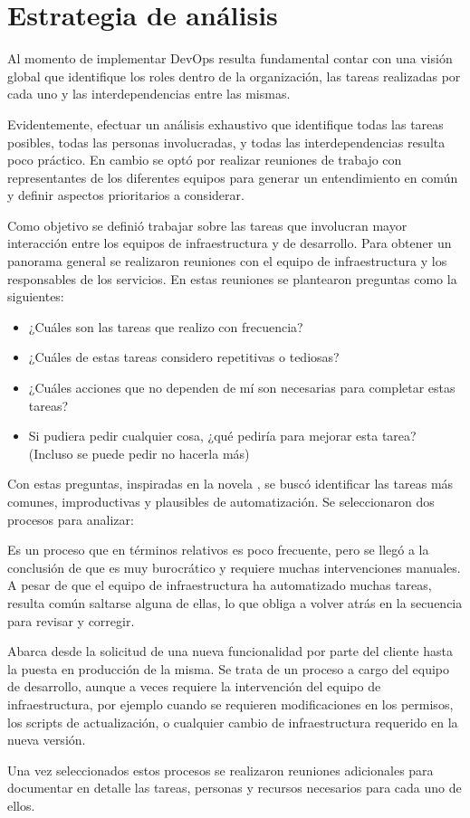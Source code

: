 \section{Estrategia de análisis}
%
Al momento de implementar DevOps resulta fundamental contar con una
visión global que identifique los roles dentro de la organización, las
tareas realizadas por cada uno y las interdependencias entre las
mismas.

Evidentemente, efectuar un análisis exhaustivo que identifique todas
las tareas posibles, todas las personas involucradas, y todas las
interdependencias resulta poco práctico. En cambio se optó por
realizar reuniones de trabajo con representantes de los diferentes
equipos para generar un entendimiento en común y definir aspectos
prioritarios a considerar.

Como objetivo se definió trabajar sobre las tareas que involucran
mayor interacción entre los equipos de infraestructura y de
desarrollo. Para obtener un panorama general se realizaron reuniones
con el equipo de infraestructura y los responsables de los
servicios. En estas reuniones se plantearon preguntas como la
siguientes:
%
\begin{itemize}
\item ¿Cuáles son las tareas que realizo con frecuencia?
\item ¿Cuáles de estas tareas considero repetitivas o tediosas?
\item ¿Cuáles acciones que no dependen de mí son necesarias para
  completar estas tareas?
\item Si pudiera pedir cualquier cosa, ¿qué pediría para mejorar esta
  tarea? (Incluso se puede pedir no hacerla más)
\end{itemize}
%
Con estas preguntas, inspiradas en la novela 
\cite{phoenix}, se buscó identificar las tareas más comunes,
improductivas y plausibles de automatización. Se seleccionaron dos
procesos para analizar:
%
\begin{description}[style=nextline]
%
\item[La creación de entornos para un nuevo servicio.]
  Es un proceso que en términos relativos es poco frecuente, pero se
  llegó a la conclusión de que es muy burocrático y requiere muchas
  intervenciones manuales. A pesar de que el equipo de infraestructura
  ha automatizado muchas tareas, resulta común saltarse alguna de ellas,
  lo que obliga a volver atrás en la secuencia para revisar y corregir.
%
\item[Entrega de un nuevo requerimiento en un servicio.]
  Abarca desde la solicitud de una nueva funcionalidad por parte del
  cliente hasta la puesta en producción de la misma. Se trata de un
  proceso a cargo del equipo de desarrollo, aunque a veces requiere la
  intervención del equipo de infraestructura, por ejemplo cuando se
  requieren modificaciones en los permisos, los scripts de
  actualización, o cualquier cambio de infraestructura requerido en la
  nueva versión.
\end{description}
%
Una vez seleccionados estos procesos se realizaron reuniones
adicionales para documentar en detalle las tareas, personas y recursos
necesarios para cada uno de ellos.
%
%
